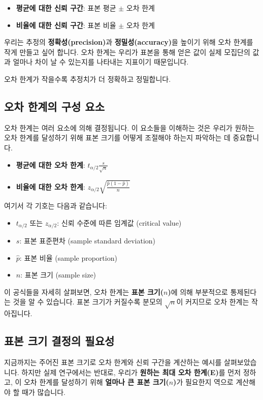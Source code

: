 \documentclass[11pt,a4paper]{article}
\theoremstyle{definition}
\begin{document}
\begin{enumerate}
\begin{enumerate}
\begin{itemize}
    \item \textbf{평균에 대한 신뢰 구간}: 표본 평균 \(\pm\) 오차 한계
    \item \textbf{비율에 대한 신뢰 구간}: 표본 비율 \(\pm\) 오차 한계
\end{itemize}

우리는 추정의 \textbf{정확성(precision)}과 \textbf{정밀성(accuracy)}을 높이기 위해 오차 한계를 작게 만들고 싶어 합니다. 오차 한계는 우리가 표본을 통해 얻은 값이 실제 모집단의 값과 얼마나 차이 날 수 있는지를 나타내는 지표이기 때문입니다.

\begin{summarybox}
    오차 한계가 작을수록 추정치가 더 정확하고 정밀합니다.
\end{summarybox}

\subsection{오차 한계의 구성 요소}
오차 한계는 여러 요소에 의해 결정됩니다. 이 요소들을 이해하는 것은 우리가 원하는 오차 한계를 달성하기 위해 표본 크기를 어떻게 조절해야 하는지 파악하는 데 중요합니다.

\begin{itemize}
    \item \textbf{평균에 대한 오차 한계}: \(t_{\alpha/2} \frac{s}{\sqrt{n}}\)
    \item \textbf{비율에 대한 오차 한계}: \(z_{\alpha/2} \sqrt{\frac{\hat{p}(1-\hat{p})}{n}}\)
\end{itemize}
여기서 각 기호는 다음과 같습니다:
\begin{itemize}
    \item \(t_{\alpha/2}\) 또는 \(z_{\alpha/2}\): 신뢰 수준에 따른 임계값 (critical value)
    \item \(s\): 표본 표준편차 (sample standard deviation)
    \item \(\hat{p}\): 표본 비율 (sample proportion)
    \item \(n\): 표본 크기 (sample size)
\end{itemize}

이 공식들을 자세히 살펴보면, 오차 한계는 \textbf{표본 크기(\(n\))}에 의해 부분적으로 통제된다는 것을 알 수 있습니다. 표본 크기가 커질수록 분모의 \(\sqrt{n}\)이 커지므로 오차 한계는 작아집니다.

\subsection{표본 크기 결정의 필요성}
지금까지는 주어진 표본 크기로 오차 한계와 신뢰 구간을 계산하는 예시를 살펴보았습니다. 하지만 실제 연구에서는 반대로, 우리가 \textbf{원하는 최대 오차 한계(E)}를 먼저 정하고, 이 오차 한계를 달성하기 위해 \textbf{얼마나 큰 표본 크기(\(n\))}가 필요한지 역으로 계산해야 할 때가 많습니다.


\end{enumerate}
\end{enumerate}
\end{document}
